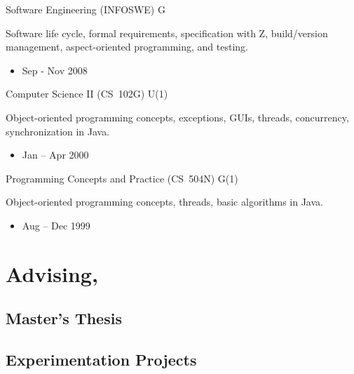 \documentclass[11pt,a4paper,roman]{moderncv}
\begin{document}
\cventry%
{}%
{Software Engineering (INFOSWE)}%
{\uu}%
{}%
{G}%
{Software life cycle, formal requirements, specification with Z, build/version management, aspect-oriented programming, and testing.
\begin{itemize}
\item Sep - Nov 2008
\end{itemize}}

\cventry%
{}%
{Computer Science II (CS~102G)}%
{\wustl}%
{}%
{U(1)}%
{Object-oriented programming concepts, exceptions, GUIs, threads, concurrency, synchronization in Java.
\begin{itemize}
\item Jan -- Apr 2000
\end{itemize}}

\cventry%
{}%
{Programming Concepts and Practice (CS~504N)}%
{\wustl}%
{}%
{G(1)}%
{Object-oriented programming concepts, threads, basic algorithms in Java.
\begin{itemize}
\item Aug -- Dec 1999
\end{itemize}}


\section{Advising, \uu}

\subsection{Master's Thesis}


\subsection{Experimentation Projects}

\end{document}
